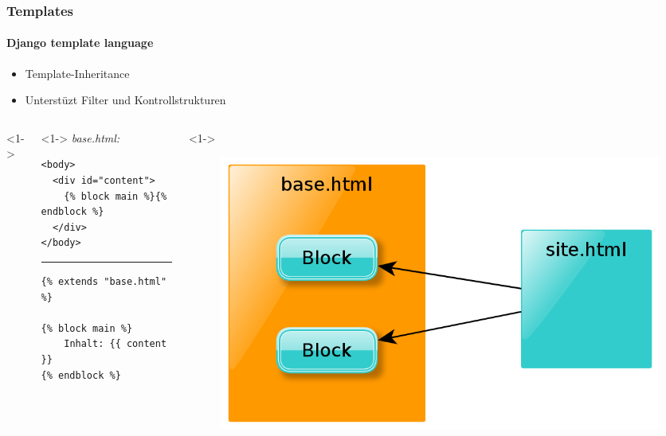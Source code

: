 \documentclass[
    t,
    smaller,
    compress,
    xcolor=svgnames,            %
    table,
]{beamer}
\begin{document}
\begin{frame}[fragile]
    \frametitle{Templates}
    \framesubtitle{Django template language}
     \begin{itemize}[<1->]
        \item Template-Inheritance
        \item Unterstüzt Filter und Kontrollstrukturen
     \end{itemize}

\vspace{12pt}
\begin{columns}<1->
    \begin{column}{.55\textwidth}<1->
    \textit{base.html:}

\begin{lstlisting}
<body>
  <div id="content">
    {% block main %}{% endblock %}
  </div>
</body>
\end{lstlisting}
\hrule
\begin{lstlisting}
{% extends "base.html" %}

{% block main %}
    Inhalt: {{ content }}
{% endblock %}
\end{lstlisting}

    \end{column}

    \begin{column}{.45\textwidth}<1->
    \vspace{12pt}
     \begin{figure}
        \includegraphics[width=\textwidth] {template.png}
      \end{figure}
    \end{column}
\end{columns}

\end{frame}
\end{document}

